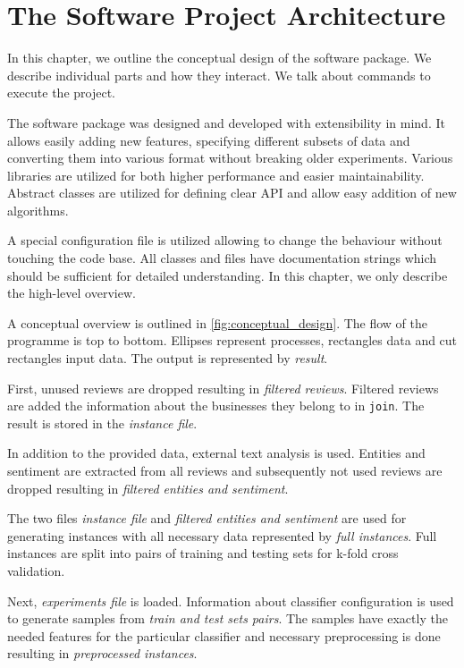 \chapter{The Software Project Architecture}\label{chap:arch}

In this chapter, we outline the conceptual design of the software package.
We describe individual parts and how they interact.
We talk about commands to execute the project.


The software package was designed and developed with extensibility in mind.
It allows easily adding new features, specifying different subsets of data and converting them into various format without breaking older experiments.
Various libraries are utilized for both higher performance and easier maintainability.
Abstract classes are utilized for defining clear API and allow easy addition of new algorithms.

A special configuration file is utilized allowing to change the behaviour without touching the code base.
All classes and files have documentation strings which should be sufficient for detailed understanding.
In this chapter, we only describe the high-level overview.

A conceptual overview is outlined in \autoref{fig:conceptual_design}.
The flow of the programme is top to bottom.
Ellipses represent processes, rectangles data and cut rectangles input data.
The output is represented by \textit{result}.

First, unused reviews are dropped resulting in \textit{filtered reviews}.
Filtered reviews are added the information about the businesses they belong to in \texttt{join}.
The result is stored in the \textit{instance file}.

In addition to the provided data, external text analysis is used.
Entities and sentiment are extracted from all reviews and
subsequently not used reviews are dropped resulting in \textit{filtered entities and sentiment}.

The two files \textit{instance file} and \textit{filtered entities and sentiment} 
are used for generating instances with all necessary data represented by \textit{full instances}.
Full instances are split into pairs of training and testing sets for k-fold cross validation.

Next, \textit{experiments file} is loaded.
Information about classifier configuration is used to generate samples from \textit{train and test sets pairs}.
The samples have exactly the needed features for the particular classifier and necessary preprocessing is done
resulting in \textit{preprocessed instances}.

